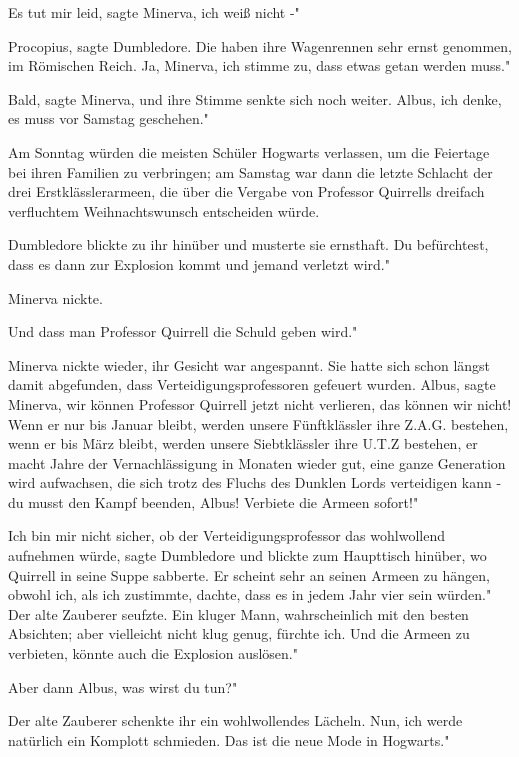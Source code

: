 \glqq Es tut mir leid\grqq{}, sagte Minerva, \glqq ich weiß nicht -"

\glqq Procopius\grqq{}, sagte Dumbledore. \glqq Die haben ihre Wagenrennen sehr
ernst genommen, im Römischen Reich. Ja, Minerva, ich stimme zu, dass etwas getan
werden muss."

\glqq Bald\grqq{}, sagte Minerva, und ihre Stimme senkte sich noch weiter. \glqq
Albus, ich denke, es muss vor Samstag geschehen."

Am Sonntag würden die meisten Schüler Hogwarts verlassen, um die Feiertage bei
ihren Familien zu verbringen; am Samstag war dann die letzte Schlacht der drei
Erstklässlerarmeen, die über die Vergabe von Professor Quirrells dreifach
verfluchtem Weihnachtswunsch entscheiden würde.

Dumbledore blickte zu ihr hinüber und musterte sie ernsthaft. \glqq Du
befürchtest, dass es dann zur Explosion kommt und jemand verletzt wird."

Minerva nickte.

\glqq Und dass man Professor Quirrell die Schuld geben wird."

Minerva nickte wieder, ihr Gesicht war angespannt. Sie hatte sich schon längst
damit abgefunden, dass Verteidigungsprofessoren gefeuert wurden. \glqq
Albus\grqq{}, sagte Minerva, \glqq wir können Professor Quirrell jetzt nicht
verlieren, das können wir nicht! Wenn er nur bis Januar bleibt, werden unsere
Fünftklässler ihre Z.A.G. bestehen, wenn er bis März bleibt, werden unsere
Siebtklässler ihre U.T.Z bestehen, er macht Jahre der Vernachlässigung in
Monaten wieder gut, eine ganze Generation wird aufwachsen, die sich trotz des
Fluchs des Dunklen Lords verteidigen kann - du musst den Kampf beenden, Albus!
Verbiete die Armeen sofort!"

\glqq Ich bin mir nicht sicher, ob der Verteidigungsprofessor das wohlwollend
aufnehmen würde\grqq{}, sagte Dumbledore und blickte zum Haupttisch hinüber, wo
Quirrell in seine Suppe sabberte. \glqq Er scheint sehr an seinen Armeen zu
hängen, obwohl ich, als ich zustimmte, dachte, dass es in jedem Jahr vier sein
würden." Der alte Zauberer seufzte. \glqq Ein kluger Mann, wahrscheinlich mit
den besten Absichten; aber vielleicht nicht klug genug, fürchte ich. Und die
Armeen zu verbieten, könnte auch die Explosion auslösen."

\glqq Aber dann Albus, was wirst du tun?"

Der alte Zauberer schenkte ihr ein wohlwollendes Lächeln. \glqq Nun, ich werde
natürlich ein Komplott schmieden. Das ist die neue Mode in Hogwarts."

